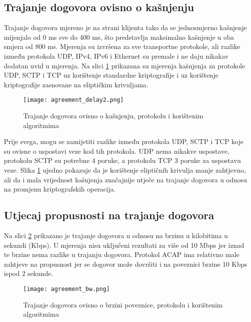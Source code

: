 \subsection{Trajanje dogovora ovisno o kašnjenju}

Trajanje dogovora mjereno je na strani klijenta tako da se jednosmjerno
kašnjenje mijenjalo od 0 ms sve do 400 ms, što predstavlja maksimalno kašnjenje
u oba smjera od 800 ms. Mjerenja su izvršena za sve transportne protokole, ali
razlike između protokola UDP, IPv4, IPv6 i Ethernet su premale i ne daju nikakav
dodatan uvid u mjerenja. Na slici \ref{fig:agreement_delay} prikazana su
mjerenja kašnjenja za protokole UDP, SCTP i TCP uz korištenje standardne
kriptografije i uz korištenje kriptografije zasnovane na eliptičkim krivuljama.

\begin{figure}[h]
    \centering
    \texttt{[image: agreement\_delay2.png]}
    \caption{Trajanje dogovora ovisno o kašnjenju, protokolu i korištenim algoritmima}
    \label{fig:agreement_delay}
\end{figure}

Prije svega, mogu se zamijetiti razlike između protokola UDP, SCTP i TCP koje su
ovisne o uspostavi veze kod tih protokola. UDP nema nikakve uspostave, protokolu
SCTP su potrebne 4 poruke, a protokolu TCP 3 poruke za uspostavu
veze. Slika \ref{fig:agreement_delay} ujedno pokazuje da je korištenje
eliptičnih krivulja manje zahtjevno, ali da i mala vrijednost kašnjenja
značajnije utječe na trajanje dogovora u odnosu na promjenu kriptografskih
operacija.

\subsection{Utjecaj propusnosti na trajanje dogovora}

Na slici \ref{fig:agreement_bw} prikazano je trajanje dogovora u odnosu na
brzinu u kilobitima u sekundi (Kbps). U mjerenja nisu uključeni rezultati za
više od 10 Mbps jer iznad te brzine nema razlike u trajanju dogovora. Protokol
ACAP ima
relativno male zahtjeve na propusnost jer se dogovor može dovršiti i na
poveznici brzine 10 Kbps ispod 2 sekunde.

\begin{figure}[h]
    \centering
    \texttt{[image: agreement\_bw.png]}
    \caption{Trajanje dogovora ovisno o brzini poveznice, protokolu i korištenim algoritmima}
    \label{fig:agreement_bw}
\end{figure}

